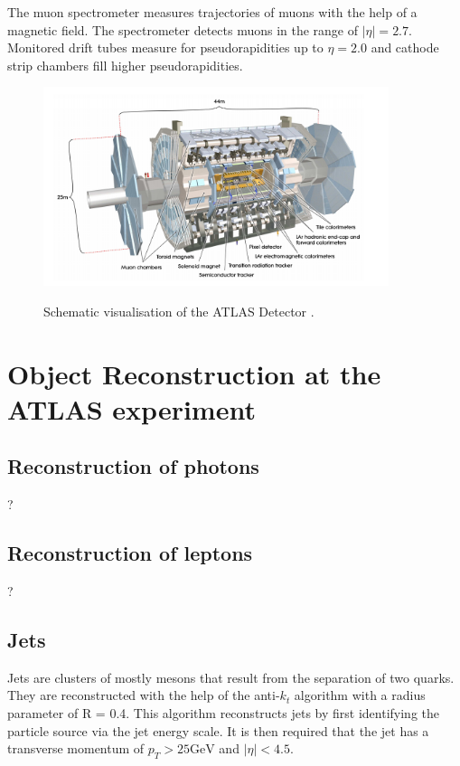 The muon spectrometer measures trajectories of muons with the help of a magnetic field. The spectrometer detects muons in the range of $\bigl|\eta\bigr| = 2.7$. 
Monitored drift tubes measure for pseudorapidities up to $\eta = 2.0$ and cathode strip chambers fill higher pseudorapidities.  
\begin{figure}
    \centering
    \includegraphics[width=0.9\textwidth]{Plots/atlasSCHEMA.PNG}
    \label{fig:atlasschema}
    \caption{Schematic visualisation of the ATLAS Detector \cite{Collaboration_2008}.}
\end{figure}



\section{Object Reconstruction at the ATLAS experiment}

\subsection{Reconstruction of photons}
\label{sec:reconphoton}
?
\subsection{Reconstruction of leptons}
\label{sec:reconlepton}
?
\subsection{Jets}
\label{sec:jets}
Jets are clusters of mostly mesons that result from the separation of two quarks. They are reconstructed with the help of the anti-$k_t$ algorithm \cite{anti_k_t} with a radius parameter of R = 0.4. 
This algorithm reconstructs jets by first identifying the particle source via the jet energy scale. It is then required that the jet has a transverse momentum of $p_T > 25 \si{\giga\electronvolt}$ and $\bigl|\eta\bigr| < 4.5$. 

